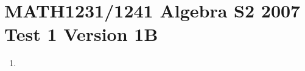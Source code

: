 \section*{MATH1231/1241 Algebra S2 2007 Test 1 Version 1B}
\begin{enumerate}
    \item 
\end{enumerate}
